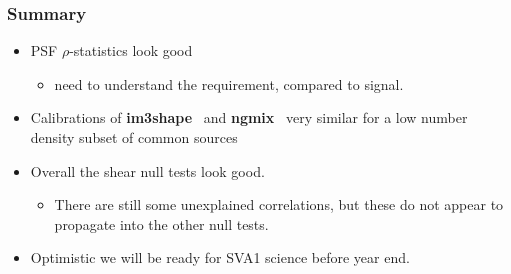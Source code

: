\documentclass{beamer}
\newcommand{\ngmix}{ {\bf ngmix} }
\newcommand{\imshape}{ {\bf im3shape} }
\begin{document}
\frame
{
    \frametitle{Summary}

    \begin{itemize}

        \item PSF $\rho$-statistics look good
            \begin{itemize}
                \item need to understand the requirement, compared to signal.
            \end{itemize}

        \item Calibrations of \imshape\ and \ngmix\ very similar for a low number
            density subset of common sources

        \item Overall the shear null tests look good.

            \begin{itemize}

                \item There are still some unexplained correlations, but these
                    do not appear to propagate into the other null tests.

            \end{itemize}
            
        \item Optimistic we will be ready for SVA1 science before year end.

    \end{itemize}
}
\end{document}
